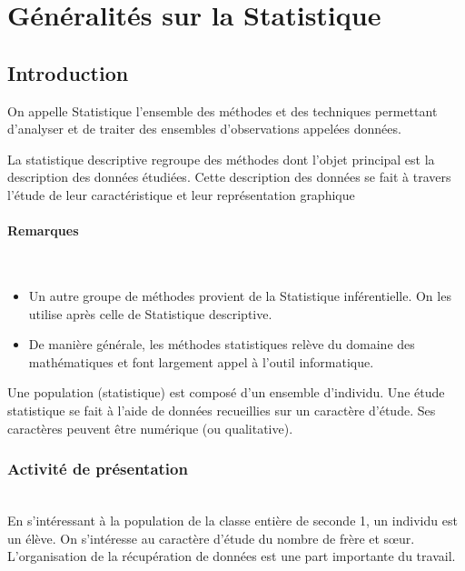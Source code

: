 \documentclass[paper=a4, fontsize=9pt]{scrartcl} %
\begin{document}
\section{Généralités sur la Statistique}
\begin{multicols}{2}

  \subsection{Introduction}

  \begin{Definition}
    On appelle Statistique l'ensemble des méthodes et des techniques permettant d'analyser et de traiter des ensembles d'observations appelées données.
  \end{Definition}

  \begin{Definition}
    La statistique descriptive regroupe des méthodes dont l'objet principal est la description des données étudiées.
    Cette description des données se fait à travers l'étude de leur caractéristique et leur représentation graphique
  \end{Definition}

  \paragraph{Remarques}~~\\
  \begin{itemize}
  \item Un autre groupe de méthodes provient de la Statistique inférentielle. On les utilise après celle de Statistique descriptive.
  \item De manière générale, les méthodes statistiques relève du domaine des mathématiques et font largement appel à l'outil informatique.
  \end{itemize}

  \begin{Definition}
    Une population (statistique) est composé d'un ensemble d'individu. Une étude statistique se fait à l'aide de données recueillies
    sur un caractère d'étude. Ses caractères peuvent être numérique (ou  qualitative).
  \end{Definition}

  \subsubsection{Activité de présentation}~~\\
  En s'intéressant à la population de la classe entière de seconde 1, un individu est un élève. On s'intéresse au caractère d'étude du nombre de frère et sœur.
  L'organisation de la récupération de données est une part importante du travail.


\end{multicols}
\end{document}
